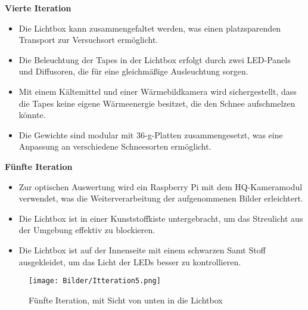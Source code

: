 \textbf{Vierte Iteration}

\begin{itemize}
    \item Die Lichtbox kann zusammengefaltet werden, was einen platzsparenden Transport zur Versuchsort ermöglicht.
    \item Die Beleuchtung der Tapes in der Lichtbox erfolgt durch zwei LED-Panels und Diffusoren, die für eine gleichmäßige Ausleuchtung sorgen.
    \item Mit einem Kältemittel und einer Wärmebildkamera wird sichergestellt, dass die Tapes keine eigene Wärmeenergie besitzet, die den Schnee aufschmelzen könnte.
    \item Die Gewichte sind modular mit 36-g-Platten zusammengesetzt, was eine Anpassung an verschiedene Schneesorten ermöglicht.
\end{itemize}

\textbf{Fünfte Iteration}

\begin{itemize}
    \item Zur optischen Auswertung wird ein Raspberry Pi mit dem HQ-Kameramodul verwendet, was die Weiterverarbeitung der aufgenommenen Bilder erleichtert.
    \item Die Lichtbox ist in einer Kunststoffkiste untergebracht, um das Streulicht aus der Umgebung effektiv zu blockieren.
      \item Die Lichtbox ist auf der Innenseite mit einem schwarzen Samt Stoff ausgekleidet, um das Licht der LEDs besser zu kontrollieren.
\end{itemize}


\begin{figure}
    \centering
    \texttt{[image: Bilder/Itteration5.png]}
    \caption{Fünfte Iteration, mit Sicht von unten in die Lichtbox}
    \label{fig:funfItter}
\end{figure}
